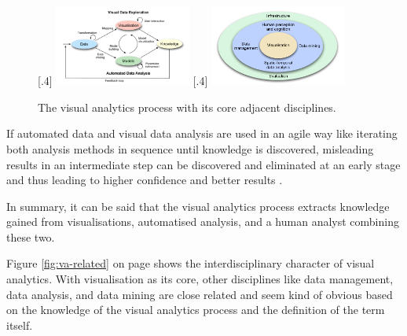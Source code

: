 \begin{figure}[!htb]
    \centering
  [.4\linewidth]
    {
        \includegraphics[width=0.4\textwidth,keepaspectratio]
        {images/va/va-process.png}
    }
    \qquad
    [.4\linewidth]
    {
        \includegraphics[width=0.4\textwidth,keepaspectratio]
        {images/va/va-related.png}
    }

    \caption{The visual analytics process with its core adjacent disciplines.}
\end{figure}

If automated data and visual data analysis are used in an agile way like iterating both analysis methods in sequence until knowledge is discovered, misleading results in an intermediate step can be discovered and eliminated at an early stage and thus leading to higher confidence and better results .

In summary, it can be said that the visual analytics process extracts knowledge gained from visualisations, automatised analysis, and a human analyst combining these two.

Figure \ref{fig:va-related} on page \pageref{fig:va-related} shows the interdisciplinary character of visual analytics. With visualisation as its core, other disciplines like data management, data analysis, and data mining are close related and seem kind of obvious based on the knowledge of the visual analytics process and the definition of the term itself.
